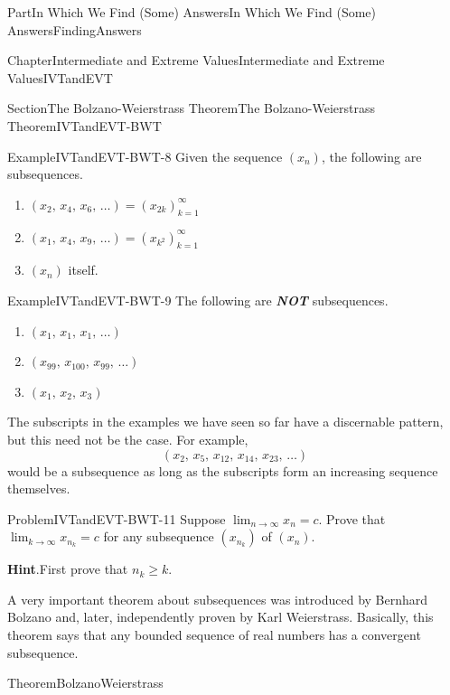 \documentclass[oneside,10pt,]{book}
\newcommand{\blocktitlefont}{\relax}
\newcommand{\alert}[1]{\textbf{\textit{#1}}}
\numberwithin{equation}{part}
\begin{document}
\begin{partptx}{Part}{In Which We Find (Some) Answers}{}{In Which We Find (Some) Answers}{}{}{FindingAnswers}
\begin{chapterptx}{Chapter}{Intermediate and Extreme Values}{}{Intermediate and Extreme Values}{}{}{IVTandEVT}
\begin{sectionptx}{Section}{The Bolzano-Weierstrass Theorem}{}{The Bolzano-Weierstrass Theorem}{}{}{IVTandEVT-BWT}
\begin{example}{Example}{}{IVTandEVT-BWT-8}%
Given the sequence \(\left(x_n\right)\), the following are subsequences.%
\begin{enumerate}[font=\bfseries,label=(\alph*),ref=\alph*]%
\item{}\(\left(x_2,\,x_4,\,x_6,\,\ldots\right)=\left(x_{2k}\right)_{k=1}^\infty\)%
\item{}\(\left(x_1,\,x_4,\,x_9,\,\ldots\right)=\left(x_{k^2}\right)_{k=1}^ \infty\)%
\item{}\(\left(x_n\right)\) itself.%
\end{enumerate}%
\end{example}
\begin{example}{Example}{}{IVTandEVT-BWT-9}%
The following are \alert{NOT} subsequences.%
\begin{enumerate}[font=\bfseries,label=(\alph*),ref=\alph*]%
\item{}\(\left(x_1,\,x_1,\,x_1,\,\ldots\right)\)%
\item{}\(\left(x_{99},\,x_{100},\,x_{99},\,\ldots\right)\)%
\item{}\(\left(x_1,\,x_2,\,x_3\right)\)%
\end{enumerate}%
\end{example}
The subscripts in the examples we have seen so far have a discernable pattern, but this need not be the case. For example,%
\begin{equation*}
\left(x_2,\,x_5,\,x_{12},\,x_{14},\,x_{23},\,\ldots\right)
\end{equation*}
would be a subsequence as long as the subscripts form an increasing sequence themselves.%
\begin{problem}{Problem}{}{IVTandEVT-BWT-11}%
 Suppose \(\lim_{n\rightarrow\infty}x_n=c\). Prove that \(\lim_{k\rightarrow\infty}x_{n_k}=c\) for any subsequence \(\left(x_{n_k}\right)\) of \(\left(x_n\right)\).%
\par\smallskip%
\noindent\textbf{\blocktitlefont Hint}.\hypertarget{IVTandEVT-BWT-11-2}{}\quad{}First prove that \(n_k\geq k\).%
\end{problem}
A very important theorem about subsequences was introduced by Bernhard Bolzano  and, later, independently proven  by Karl Weierstrass. Basically, this theorem says that any bounded sequence of real numbers has a convergent subsequence.%
\begin{theorem}{Theorem}{}{}{BolzanoWeierstrass}%

\end{theorem}
\end{sectionptx}
\end{chapterptx}
\end{partptx}
\end{document}
